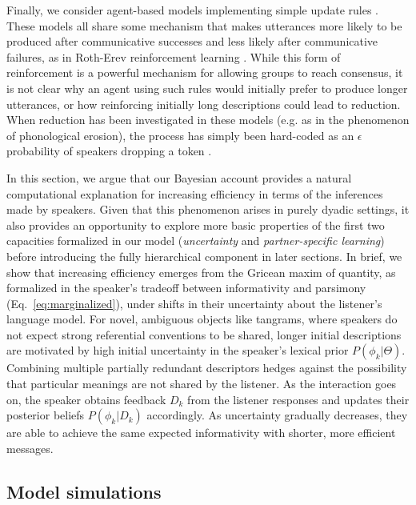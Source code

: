 Finally, we consider agent-based models implementing simple update rules \cite{steels_self-organizing_1995,barr_establishing_2004,young_evolution_2015}.
These models all share some mechanism that makes utterances more likely to be produced after communicative successes and less likely after communicative failures, as in Roth-Erev reinforcement learning \cite{erev1998predicting}.
While this form of reinforcement is a powerful mechanism for allowing groups to reach consensus, it is not clear why an agent using such rules would initially prefer to produce longer utterances, or how reinforcing initially long descriptions could lead to reduction.%
When reduction has been investigated in these models (e.g. as in the phenomenon of phonological erosion), the process has simply been hard-coded as an $\epsilon$ probability of speakers dropping a token \cite{beuls2013agent,steels2016agent}.

In this section, we argue that our Bayesian account provides a natural computational explanation for increasing efficiency in terms of the inferences made by speakers.
Given that this phenomenon arises in purely dyadic settings, it also provides an opportunity to explore more basic properties of the first two capacities formalized in our model (\emph{uncertainty} and \emph{partner-specific learning}) before introducing the fully hierarchical component in later sections. 
In brief, we show that increasing efficiency emerges from the Gricean maxim of quantity, as formalized in the speaker's tradeoff between informativity and parsimony (Eq.~\ref{eq:marginalized}), under shifts in their uncertainty about the listener's language model. 
For novel, ambiguous objects like tangrams, where speakers do not expect strong referential conventions to be shared, longer initial descriptions are motivated by high initial uncertainty in the speaker's lexical prior $P(\phi_k | \Theta)$. 
Combining multiple partially redundant descriptors hedges against the possibility that particular meanings are not shared by the listener.
As the interaction goes on, the speaker obtains feedback $D_k$ from the listener responses and updates their posterior beliefs $P(\phi_k | D_k)$ accordingly. 
As uncertainty gradually decreases, they are able to achieve the same expected informativity with shorter, more efficient messages. 

\subsection{Model simulations}

